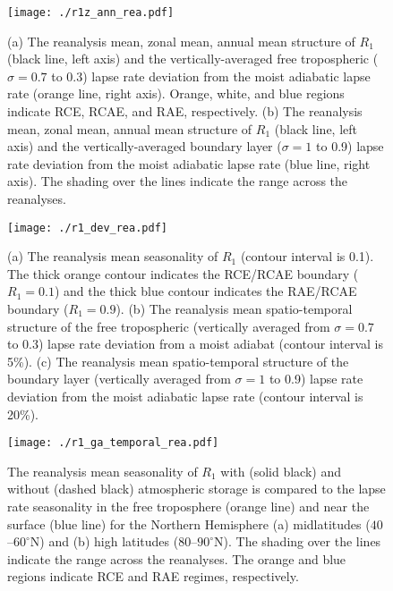 \documentclass{ametsocV5}
\begin{document}
\begin{figure}[t]
  \centering
  \noindent\texttt{[image: ./r1z\_ann\_rea.pdf]}\\
  \caption{(a) The reanalysis mean, zonal mean, annual mean structure of $R_1$ (black line, left axis) and the vertically-averaged free tropospheric ($\sigma=0.7$ to 0.3) lapse rate deviation from the moist adiabatic lapse rate (orange line, right axis). Orange, white, and blue regions indicate RCE, RCAE, and RAE, respectively. (b) The reanalysis mean, zonal mean, annual mean structure of $R_1$ (black line, left axis) and the vertically-averaged boundary layer ($\sigma=1$ to 0.9) lapse rate deviation from the moist adiabatic lapse rate (blue line, right axis). The shading over the lines indicate the range across the reanalyses.}
  \label{fig:rea-r1-ann}
\end{figure}

\begin{figure}[t]
  \centering
  \noindent\texttt{[image: ./r1\_dev\_rea.pdf]}\\
  \caption{(a) The reanalysis mean seasonality of $R_{1}$ (contour interval is 0.1). The thick orange contour indicates the RCE/RCAE boundary ($R_1=0.1$) and the thick blue contour indicates the RAE/RCAE boundary ($R_1 = 0.9$). (b) The reanalysis mean spatio-temporal structure of the free tropospheric (vertically averaged from $\sigma=0.7$ to 0.3) lapse rate deviation from a moist adiabat (contour interval is 5\%). (c) The reanalysis mean spatio-temporal structure of the boundary layer (vertically averaged from $\sigma=1$ to 0.9) lapse rate deviation from the moist adiabatic lapse rate (contour interval is 20\%).}
  \label{fig:rea-r1-dev}
\end{figure}

\begin{figure}[t]
  \noindent\texttt{[image: ./r1\_ga\_temporal\_rea.pdf]}\\
  \caption{The reanalysis mean seasonality of $R_1$ with (solid black) and without (dashed black) atmospheric storage is compared to the lapse rate seasonality in the free troposphere (orange line) and near the surface (blue line) for the Northern Hemisphere (a) midlatitudes ($40$--$60^\circ$N) and (b) high latitudes ($80$--$90^\circ$N). The shading over the lines indicate the range across the reanalyses. The orange and blue regions indicate RCE and RAE regimes, respectively.}
  \label{fig:rea-r1-ga-temporal}
\end{figure}
\end{document}
